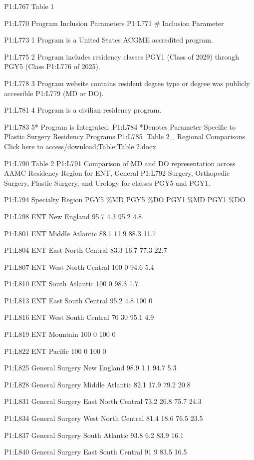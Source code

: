 P1:L767 Table 1

P1:L770 Program Inclusion Parameters P1:L771 \# Inclusion Parameter

P1:L773 1 Program is a United States ACGME accredited program.

P1:L775 2 Program includes residency classes PGY1 (Class of 2029)
through PGY5 (Class P1:L776 of 2025).

P1:L778 3 Program website contains resident degree type or degree was
publicly accessible P1:L779 (MD or DO).

P1:L781 4 Program is a civilian residency program.

P1:L783 5* Program is Integrated. P1:L784 *Denotes Parameter Specific to
Plastic Surgery Residency Programs P1:L785 Table 2\_ Regional
Comparisons Click here to access/download;Table;Table 2.docx

P1:L790 Table 2 P1:L791 Comparison of MD and DO representation across
AAMC Residency Region for ENT, General P1:L792 Surgery, Orthopedic
Surgery, Plastic Surgery, and Urology for classes PGY5 and PGY1.

P1:L794 Specialty Region PGY5 \%MD PGY5 \%DO PGY1 \%MD PGY1 \%DO

P1:L798 ENT New England 95.7 4.3 95.2 4.8

P1:L801 ENT Middle Atlantic 88.1 11.9 88.3 11.7

P1:L804 ENT East North Central 83.3 16.7 77.3 22.7

P1:L807 ENT West North Central 100 0 94.6 5.4

P1:L810 ENT South Atlantic 100 0 98.3 1.7

P1:L813 ENT East South Central 95.2 4.8 100 0

P1:L816 ENT West South Central 70 30 95.1 4.9

P1:L819 ENT Mountain 100 0 100 0

P1:L822 ENT Pacific 100 0 100 0

P1:L825 General Surgery New England 98.9 1.1 94.7 5.3

P1:L828 General Surgery Middle Atlantic 82.1 17.9 79.2 20.8

P1:L831 General Surgery East North Central 73.2 26.8 75.7 24.3

P1:L834 General Surgery West North Central 81.4 18.6 76.5 23.5

P1:L837 General Surgery South Atlantic 93.8 6.2 83.9 16.1

P1:L840 General Surgery East South Central 91 9 83.5 16.5

